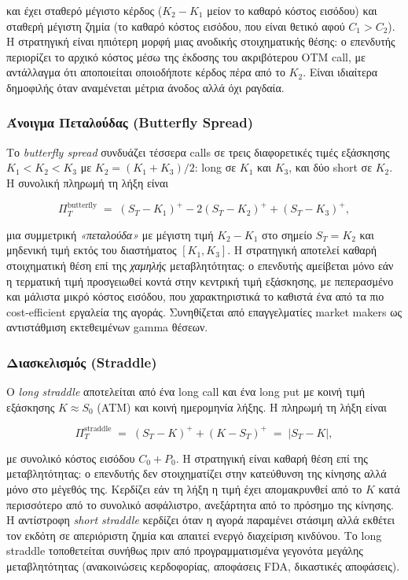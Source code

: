 \documentclass[12pt]{article}
\begin{document}
και έχει σταθερό μέγιστο κέρδος ($K_2 - K_1$ μείον το καθαρό κόστος εισόδου) και σταθερή μέγιστη ζημία (το καθαρό κόστος εισόδου, που είναι θετικό αφού $C_1 > C_2$). Η στρατηγική είναι ηπιότερη μορφή μιας ανοδικής στοιχηματικής θέσης: ο επενδυτής περιορίζει το αρχικό κόστος μέσω της έκδοσης του ακριβότερου OTM call, με αντάλλαγμα ότι αποποιείται οποιοδήποτε κέρδος πέρα από το $K_2$. Είναι ιδιαίτερα δημοφιλής όταν αναμένεται μέτρια άνοδος αλλά όχι ραγδαία.

\subsubsection{Άνοιγμα Πεταλούδας (Butterfly Spread)}

Το \emph{butterfly spread} συνδυάζει τέσσερα calls σε τρεις διαφορετικές τιμές εξάσκησης $K_1 < K_2 < K_3$ με $K_2 = (K_1 + K_3)/2$: long σε $K_1$ και $K_3$, και δύο short σε $K_2$. Η συνολική πληρωμή τη λήξη είναι

$$
\Pi^{\text{butterfly}}_T \;=\; (S_T - K_1)^+ - 2(S_T - K_2)^+ + (S_T - K_3)^+ ,
$$

μια συμμετρική \emph{«πεταλούδα»} με μέγιστη τιμή $K_2 - K_1$ στο σημείο $S_T = K_2$ και μηδενική τιμή εκτός του διαστήματος $[K_1, K_3]$. Η στρατηγική αποτελεί καθαρή στοιχηματική θέση επί της \emph{χαμηλής} μεταβλητότητας: ο επενδυτής αμείβεται μόνο εάν η τερματική τιμή προσγειωθεί κοντά στην κεντρική τιμή εξάσκησης, με πεπερασμένο και μάλιστα μικρό κόστος εισόδου, που χαρακτηριστικά το καθιστά ένα από τα πιο cost-efficient εργαλεία της αγοράς. Συνηθίζεται από επαγγελματίες market makers ως αντιστάθμιση εκτεθειμένων gamma θέσεων.

\subsubsection{Διασκελισμός (Straddle)}

Ο \emph{long straddle} αποτελείται από ένα long call και ένα long put με κοινή τιμή εξάσκησης $K \approx S_0$ (ATM) και κοινή ημερομηνία λήξης. Η πληρωμή τη λήξη είναι

$$
\Pi^{\text{straddle}}_T \;=\; (S_T - K)^+ + (K - S_T)^+ \;=\; |S_T - K|,
$$

με συνολικό κόστος εισόδου $C_0 + P_0$. Η στρατηγική είναι καθαρή θέση επί της μεταβλητότητας: ο επενδυτής δεν στοιχηματίζει στην κατεύθυνση της κίνησης αλλά μόνο στο μέγεθός της. Κερδίζει εάν τη λήξη η τιμή έχει απομακρυνθεί από το $K$ κατά περισσότερο από το συνολικό ασφάλιστρο, ανεξάρτητα από το πρόσημο της κίνησης. Η αντίστροφη \emph{short straddle} κερδίζει όταν η αγορά παραμένει στάσιμη αλλά εκθέτει τον εκδότη σε απεριόριστη ζημία και απαιτεί ενεργό διαχείριση κινδύνου. Το long straddle τοποθετείται συνήθως πριν από προγραμματισμένα γεγονότα μεγάλης μεταβλητότητας (ανακοινώσεις κερδοφορίας, αποφάσεις FDA, δικαστικές αποφάσεις).
\end{document}
